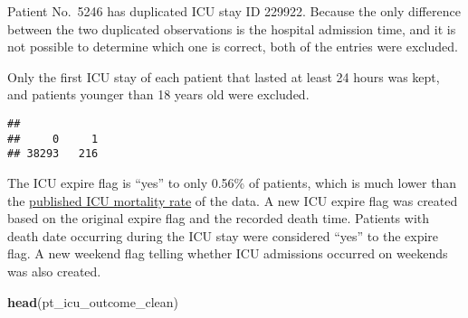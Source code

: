 \documentclass[
]{article}
\newenvironment{Shaded}{\begin{snugshade}}{\end{snugshade}}
\newcommand{\CommentTok}[1]{\textcolor[rgb]{0.56,0.35,0.01}{\textit{#1}}}
\newcommand{\FunctionTok}[1]{\textcolor[rgb]{0.13,0.29,0.53}{\textbf{#1}}}
\newcommand{\NormalTok}[1]{#1}
\newcommand{\SpecialCharTok}[1]{\textcolor[rgb]{0.81,0.36,0.00}{\textbf{#1}}}
\begin{document}
Patient No.~5246 has duplicated ICU stay ID 229922. Because the only
difference between the two duplicated observations is the hospital
admission time, and it is not possible to determine which one is
correct, both of the entries were excluded.

Only the first ICU stay of each patient that lasted at least 24 hours
was kept, and patients younger than 18 years old were excluded.

\begin{Shaded}
\end{Shaded}

\begin{verbatim}
## 
##     0     1 
## 38293   216
\end{verbatim}

The ICU expire flag is ``yes'' to only 0.56\% of patients, which is much
lower than the
\href{https://www.nature.com/articles/sdata201635/tables/2}{published
ICU mortality rate} of the data. A new ICU expire flag was created based
on the original expire flag and the recorded death time. Patients with
death date occurring during the ICU stay were considered ``yes'' to the
expire flag. A new weekend flag telling whether ICU admissions occurred
on weekends was also created.

\begin{Shaded}
\begin{Highlighting}[]
\FunctionTok{head}\NormalTok{(pt\_icu\_outcome\_clean)}
\end{Highlighting}
\end{Shaded}
\end{document}
